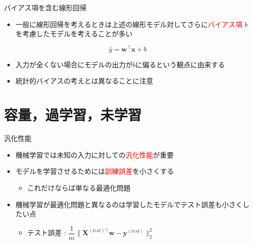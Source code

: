 \documentclass[dvipdfmx, 10pt]{beamer}
\begin{document}

\begin{frame}{バイアス項を含む線形回帰}
  \begin{itemize}
    \item 一般に線形回帰を考えるときは上述の線形モデル対してさらに\textcolor{red}{バイアス項} $b$ を考慮したモデルを考えることが多い
  \end{itemize}
  \begin{equation}
    \hat{y} = \bm{w} ^ {\top} \bm{x} + b
  \end{equation}
  \begin{itemize}
    \item 入力が全くない場合にモデルの出力が$b$に偏るという観点に由来する
    \item 統計的バイアスの考えとは異なることに注意
  \end{itemize}
\end{frame}


\section{容量，過学習，未学習}


\begin{frame}{汎化性能}
  \begin{itemize}
    \item 機械学習では未知の入力に対しての\textcolor{red}{汎化性能}が重要
    \item モデルを学習させるためには\textcolor{red}{訓練誤差}を小さくする
    \begin{itemize}
      \item これだけならば単なる最適化問題
    \end{itemize}
    \item 機械学習が最適化問題と異なるのは学習したモデルでテスト誤差も小さくしたい点
    \begin{itemize}
      \item テスト誤差 : $\dfrac{1} {m} \| \bm{X} ^ {(test)\top} \bm{w} - \bm{y} ^ {(test)} \| _{2}^{2}$
    \end{itemize}
  \end{itemize}
\end{frame}

\end{document}
